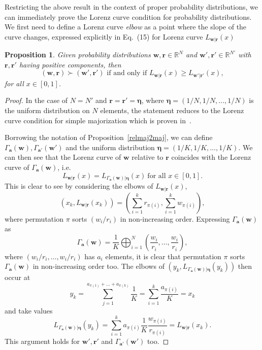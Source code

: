 \documentclass[
twocolumn,
superscriptaddress
]{revtex4-1}
\newcommand{\revhigh}[1]{{\color{red}#1}}
\newtheorem{proposition}[theorem]{Proposition}
\def\bmeta{\boldsymbol{\eta}}
\def\bma{\boldsymbol{a}}
\def\r{\boldsymbol{r}}
\def\w{\boldsymbol{w}}
\begin{document}
\revhigh{
Restricting the above result in the context of proper probability distributions, we can immediately prove the Lorenz curve condition for probability distributions.
We first need to define a Lorenz curve \emph{elbow} as a point where the slope of the curve changes, expressed explicitly in Eq.~(15) for Lorenz curve $L_{\w | \r}(x)$
\begin{proposition}\label{thm:lc_equiv_prob}
    Given probability distributions $\w, \r \in \mathbb{R}^{N}$ and $\w', \r' \in \mathbb{R}^{N'}$ with $\r,\r'$ having positive components, then
\begin{equation*}
	(\w, \r) \succ (\w', \r') \mbox{ if and only if } L_{\w |\r}(x) \ge L_{\w' |\r'}(x),
\end{equation*}
for all $x \in [0,1]$.
\end{proposition}
\begin{proof}
	In the case of $N=N'$ and $\r = \r' = \bmeta$, where $\bmeta = (1/N,1/N,\dots, 1/N)$ is the uniform distribution on $N$ elements, the statement reduces to the Lorenz curve condition for simple majorization which is proven in~\cite{cit:marshall}.

Borrowing the notation of Proposition~\ref{relmaj2maj}, we can define $\Gamma_{\bma} (\w), \Gamma_{\bma'} (\w')$ and the uniform distribution $\bmeta = (1/K, 1/K, \dots, 1/K)$.
We can then see that the Lorenz curve of $\w$ relative to $\r$ coincides with the Lorenz curve of $\Gamma_{\bma} (\w)$, i.e.
\begin{equation}
	L_{\w | \r}(x) = L_{\Gamma_{\bma} (\w) | \bmeta}(x)\ \mbox{for all } x \in [0,1].
\end{equation}
This is clear to see by considering the elbows of $L_{\w | \r}(x)$,
\begin{equation}
	(x_k, L_{\w|\r}(x_k)) = \left( \sum_{i=1}^k r_{\pi(i)}, \sum_{i=1}^k w_{\pi(i)} \right),
\end{equation}
where permutation $\pi$ sorts $(w_i/r_i)$ in non-increasing order.
Expressing $\Gamma_{\bma} (\w)$ as
\begin{equation}
	\Gamma_{\bma} (\w) = \frac{1}{K} \bigoplus_{i=1}^N \left( \frac{w_i}{r_i}, \dots, \frac{w_i}{r_i} \right),
\end{equation}
where $(w_i/r_i, \dots, w_i/r_i)$ has $a_i$ elements, it is clear that permutation $\pi$ sorts $\Gamma_{\bma}(\w)$ in non-increasing order too.
The elbows of $(y_k, L_{\Gamma_{\bma} (\w) | \bmeta}(y_k))$ then occur at
\begin{equation}
	y_k = \sum_{j=1}^{a_{\pi(1)} + \dots + a_{\pi(k)}} \frac{1}{K} = \sum_{i=1}^k \frac{a_{\pi(i)}}{K} = x_k
\end{equation}
and take values
\begin{equation}
	L_{\Gamma_{\bma} (\w) | \bmeta}(y_k) = \sum_{i=1}^k a_{\pi(i)}\frac{1}{K}\frac{w_{\pi(i)}}{r_{\pi(i)}} = L_{\w|\r}(x_k).
\end{equation}
This argument holds for $\w', \r'$ and $\Gamma_{\bma'} (\w')$ too.


\end{proof}}
\end{document}
